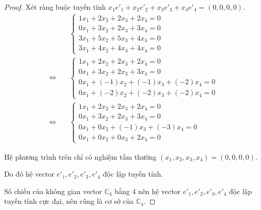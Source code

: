 \begin{proof}
    \bigskip
    Xét ràng buộc tuyến tính $x_{1}e'_{1} + x_{2}e'_{2} + x_{3}e'_{3} + x_{4}e'_{4} = (0,0,0,0)$.
    \begingroup
    \allowdisplaybreaks
    \begin{align*}
                             & \begin{cases}
                                   1x_{1} + 2x_{2} + 2x_{3} + 2x_{4} = 0 \\
                                   0x_{1} + 3x_{2} + 2x_{3} + 3x_{4} = 0 \\
                                   3x_{1} + 5x_{2} + 5x_{3} + 4x_{4} = 0 \\
                                   3x_{1} + 4x_{2} + 4x_{3} + 4x_{4} = 0
                               \end{cases} \\
        \Longleftrightarrow\quad &
        \begin{cases}
            1x_{1} + 2x_{2} + 2x_{3} + 2x_{4} = 0          \\
            0x_{1} + 3x_{2} + 2x_{3} + 3x_{4} = 0          \\
            0x_{1} + (-1)x_{2} + (-1)x_{3} + (-2)x_{4} = 0 \\
            0x_{1} + (-2)x_{2} + (-2)x_{3} + (-2)x_{4} = 0
        \end{cases}               \\
        \Longleftrightarrow\quad &
        \begin{cases}
            1x_{1} + 2x_{2} + 2x_{3} + 2x_{4} = 0       \\
            0x_{1} + 3x_{2} + 2x_{3} + 3x_{4} = 0       \\
            0x_{1} + 0x_{2} + (-1)x_{3} + (-3)x_{4} = 0 \\
            0x_{1} + 0x_{2} + 0x_{3} + 2x_{4} = 0
        \end{cases}
    \end{align*}
    \endgroup

    Hệ phương trình trên chỉ có nghiệm tầm thường $(x_{1}, x_{2}, x_{3}, x_{4}) = (0, 0, 0, 0)$.
    
    Do đó hệ vector $e'_{1}, e'_{2}, e'_{3}, e'_{4}$ độc lập tuyến tính.
    
    Số chiều của không gian vector $\mathbb{C}_{4}$ bằng 4 nên hệ vector $e'_{1}, e'_{2}, e'_{3}, e'_{4}$ độc lập tuyến tính cực đại, nên cũng là cơ sở của $\mathbb{C}_{4}$.


\end{proof}
